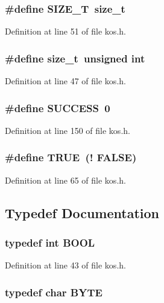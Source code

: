 \subsubsection{\setlength{\rightskip}{0pt plus 5cm}\#define SIZE\_\-T\ size\_\-t}\label{kos_8h_a1}




Definition at line 51 of file kos.h.
\subsubsection{\setlength{\rightskip}{0pt plus 5cm}\#define size\_\-t\ unsigned int}\label{kos_8h_a0}




Definition at line 47 of file kos.h.
\subsubsection{\setlength{\rightskip}{0pt plus 5cm}\#define SUCCESS\ 0}\label{kos_8h_a39}




Definition at line 150 of file kos.h.
\subsubsection{\setlength{\rightskip}{0pt plus 5cm}\#define TRUE\ (! FALSE)}\label{kos_8h_a3}




Definition at line 65 of file kos.h.

\subsection{Typedef Documentation}
\subsubsection{\setlength{\rightskip}{0pt plus 5cm}typedef int BOOL}\label{kos_8h_a51}




Definition at line 43 of file kos.h.
\subsubsection{\setlength{\rightskip}{0pt plus 5cm}typedef char BYTE}\label{kos_8h_a49}




